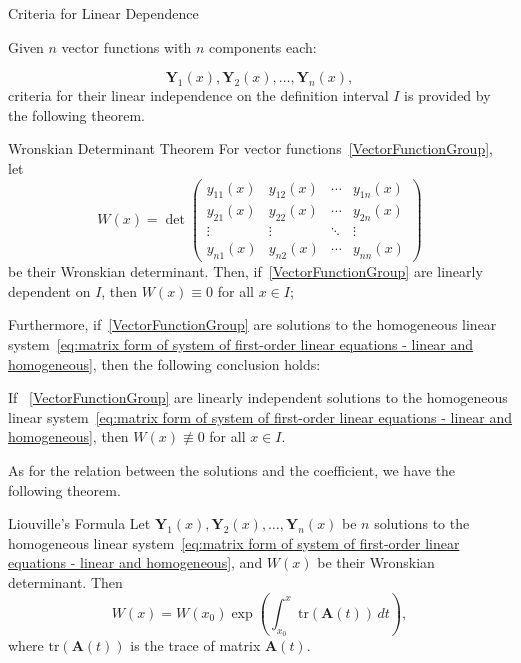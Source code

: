 \documentclass[11pt]{../../TexTemplate/elegantbook}
\begin{document}
\begin{leftbarTitle}{Criteria for Linear Dependence}\end{leftbarTitle}
Given \(n\) vector functions with \(n\) components each:

\begin{equation}\label{VectorFunctionGroup}
    \mathbf{Y}_{1}(x), \mathbf{Y}_{2}(x), \ldots, \mathbf{Y}_{n}(x),
\end{equation}
criteria for their linear independence on the definition interval \(I\) is provided by the following theorem.
\begin{theorem}{Wronskian Determinant Theorem}
    For vector functions~\eqref{VectorFunctionGroup},
    let
    \[
    W(x) = \det
    \begin{pmatrix}
        y_{11}(x) & y_{12}(x) & \cdots & y_{1n}(x) \\
        y_{21}(x) & y_{22}(x) & \cdots & y_{2n}(x) \\
        \vdots & \vdots & \ddots & \vdots \\
        y_{n1}(x) & y_{n2}(x) & \cdots & y_{nn}(x)
    \end{pmatrix}
    \]
    be their Wronskian determinant.
    Then, if~\eqref{VectorFunctionGroup} are linearly dependent on \(I\), then \(W(x) \equiv 0\) for all \(x \in I\);
\end{theorem}
Furthermore, if~\eqref{VectorFunctionGroup} are solutions to 
the homogeneous linear system~\eqref{eq:matrix form of system of first-order linear equations - linear and homogeneous},
then the following conclusion holds:
\begin{theorem}
    If ~\eqref{VectorFunctionGroup} are linearly independent solutions to 
    the homogeneous linear system~\eqref{eq:matrix form of system of first-order linear equations - linear and homogeneous},
    then \(W(x) \not\equiv 0\) for all \(x \in I\).
\end{theorem}

As for the relation between the solutions and the coefficient,
we have the following theorem.
\begin{theorem}{Liouville's Formula}
    Let \(\mathbf{Y}_{1}(x), \mathbf{Y}_{2}(x), \ldots, \mathbf{Y}_{n}(x)\) be \(n\) solutions to 
    the homogeneous linear system~\eqref{eq:matrix form of system of first-order linear equations - linear and homogeneous},
    and \(W(x)\) be their Wronskian determinant.
    Then
    \[
    W(x) = W(x_{0}) \exp\left(\int_{x_{0}}^{x} \mathrm{tr}(\mathbf{A}(t)) \, dt\right),
    \]
    where \(\mathrm{tr}(\mathbf{A}(t))\) is the trace of matrix \(\mathbf{A}(t)\).
\end{theorem}
\end{document}
